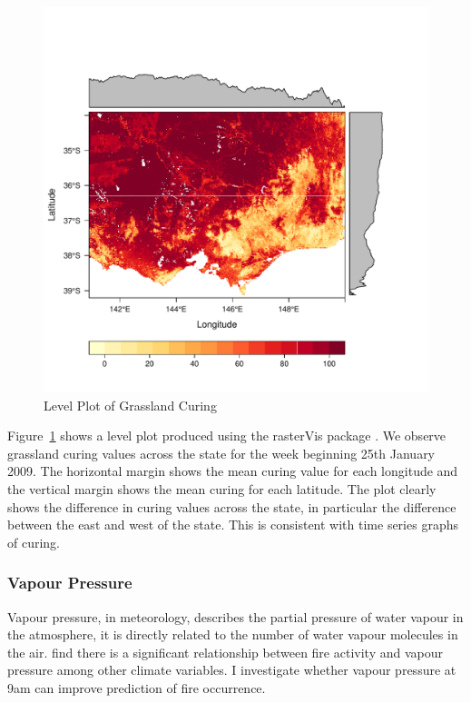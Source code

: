 \documentclass[11pt,a4paper]{article}
\begin{document}
\begin{figure}
  \centering
	\includegraphics[width=1\columnwidth]{figures/cur_lp.pdf}
  \caption{Level Plot of Grassland Curing }
  \label{fig:cur_lp}
\end{figure}


Figure~\ref{fig:cur_lp} shows a level plot produced using the rasterVis package \citep{rastervis}. We observe grassland curing values across the state for the week beginning 25th January 2009. The horizontal margin shows the mean curing value for each longitude and the vertical margin shows the mean curing for each latitude. The plot clearly shows the difference in curing values across the state, in particular the difference between the east and west of the state. This is consistent with time series graphs of curing.

\subsubsection{Vapour Pressure}

Vapour pressure, in meteorology, describes the partial pressure of water vapour in the atmosphere, it is directly related to the number of water vapour molecules in the air.  \citet{harris14} find there is a significant relationship between fire activity and vapour pressure among other climate variables. I investigate whether vapour pressure at 9am can improve prediction of fire occurrence.
\end{document}

